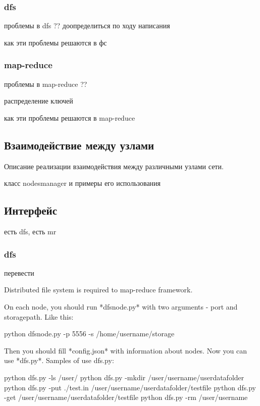 \documentclass[12pt,a4paper,oneside]{extarticle}
\begin{document}
        \subsubsection{dfs}
            проблемы в dfs ?? доопределиться по ходу написания

            как эти проблемы решаются в фс
        \subsubsection{map-reduce}
            проблемы в map-reduce ??

            распределение ключей

            как эти проблемы решаются в map-reduce
    \clearpage 

    \subsection{Взаимодействие между узлами}

        Описание реализации взаимодействия между различными узлами сети.

        класс nodesmanager и примеры его использования

    \clearpage

    \subsection{Интерфейс}

        есть dfs, есть mr

        \subsubsection{dfs}
            перевести

            Distributed file system is required to map-reduce framework.

            On each node, you should run *dfsnode.py* with two arguments - port and storagepath. Like this:


                python dfsnode.py -p 5556 -s /home/username/storage


            Then you should fill *config.json* with information about nodes. Now you can use *dfs.py*. Samples of use dfs.py:


                python dfs.py -ls /user/
                python dfs.py -mkdir /user/username/userdatafolder
                python dfs.py -put ./test.in /user/username/userdatafolder/testfile
                python dfs.py -get /user/username/userdatafolder/testfile
                python dfs.py -rm /user/username
\end{document}
